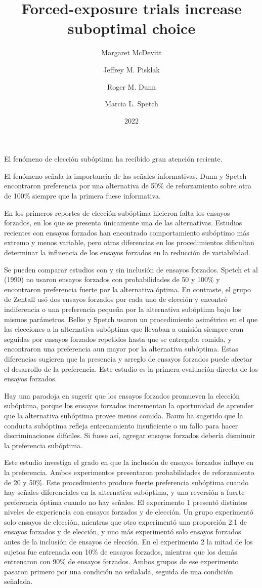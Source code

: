 \documentclass[a4paper,12pt]{article}
\title{Forced-exposure trials increase suboptimal choice}
\author{Margaret McDevitt \and Jeffrey M. Pisklak \and Roger M. Dunn \and Marcia L. Spetch}
\date{2022}
\begin{document}
{\scshape\bfseries \maketitle}

El fenómeno de elección subóptima ha recibido gran atención reciente.

El fenómeno señala la importancia de las señales informativas.
Dunn y Spetch encontraron preferencia por una alternativa de 50\% de reforzamiento sobre otra de 100\% siempre que la primera fuese informativa.

En los primeros reportes de elección subóptima hicieron falta los ensayos forzados, en los que se presenta únicamente una de las alternativas.
Estudios recientes con ensayos forzados han encontrado comportamiento subóptimo más extremo y menos variable, pero otras diferencias en los procedimientos dificultan determinar la influencia de los ensayos forzados en la reducción de variabilidad.

Se pueden comparar estudios con y sin inclusión de ensayos forzados.
Spetch et al (1990) no usaron ensayos forzados con probabilidades de 50 y 100\% y encontraron preferencia fuerte por la alternativa óptima.
En contraste, el grupo de Zentall usó dos ensayos forzados por cada uno de elección y encontró indiferencia o una preferencia pequeña por la alternativa subóptima bajo los mismos parámetros.
Belke y Spetch usaron un procedimiento asimétrico en el que las elecciones a la alternativa subóptima que llevaban a omisión siempre eran seguidas por ensayos forzados repetidos hasta que se entregaba comida, y encontraron una preferencia aun mayor por la alternativa subóptima.
Estas diferencias sugieren que la presencia y arreglo de ensayos forzados puede afectar el desarrollo de la preferencia.
Este estudio es la primera evaluación directa de los ensayos forzados.


Hay una paradoja en sugerir que los ensayos forzados promueven la elección subóptima, porque los ensayos forzados incrementan la oportunidad de aprender que la alternativa subóptima provee menos comida.
Baum ha sugerido que la conducta subóptima refleja entrenamiento insuficiente o un fallo para hacer discriminaciones difíciles.
Si fuese así, agregar ensayos forzados debería disminuir la preferencia subóptima.

Este estudio investiga el grado en que la inclusión de ensayos forzados influye en la preferencia.
Ambos experimentos presentaron probabilidades de reforzamiento de 20 y 50\%.
Este procedimiento produce fuerte preferencia subóptima cuando hay señales diferenciales en la alternativa subóptima, y una reversión a fuerte preferencia óptima cuando no hay señales.
El experimento 1 presentó distintos niveles de experiencia con ensayos forzados y de elección.
Un grupo experimentó solo ensayos de elección, mientras que otro experimentó una proporción 2:1 de ensayos forzados y de elección, y uno más experimentó solo ensayos forzados antes de la inclusión de ensayos de elección.
En el experimento 2 la mitad de los sujetos fue entrenada con 10\% de ensayos forzados, mientras que los demás entrenaron con 90\% de ensayos forzados.
Ambos grupos de ese experimento pasaron primero por una condición no señalada, seguida de una condición señalada.
\end{document}
